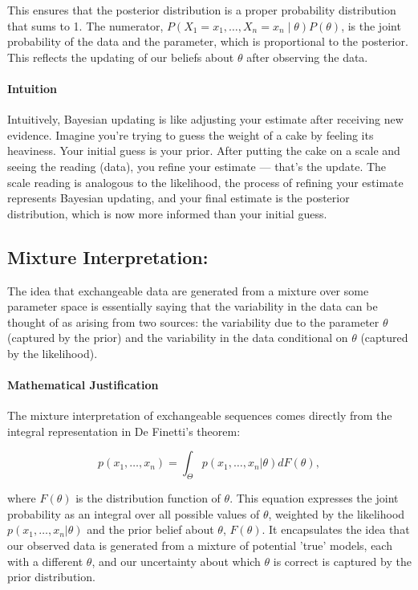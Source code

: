 \documentclass{article}
\begin{document}
This ensures that the posterior distribution is a proper probability distribution that sums to 1. The numerator, \( P(X_1 = x_1, \ldots, X_n = x_n \mid \theta) P(\theta) \), is the joint probability of the data and the parameter, which is proportional to the posterior. This reflects the updating of our beliefs about \( \theta \) after observing the data.

\paragraph{Intuition}
Intuitively, Bayesian updating is like adjusting your estimate after receiving new evidence. Imagine you're trying to guess the weight of a cake by feeling its heaviness. Your initial guess is your prior. After putting the cake on a scale and seeing the reading (data), you refine your estimate — that's the update. The scale reading is analogous to the likelihood, the process of refining your estimate represents Bayesian updating, and your final estimate is the posterior distribution, which is now more informed than your initial guess. 

\subsection{Mixture Interpretation:}
    The idea that exchangeable data are generated from a mixture over some parameter space is essentially saying that the variability in the data can be thought of as arising from two sources: the variability due to the parameter \( \theta \) (captured by the prior) and the variability in the data conditional on \( \theta \) (captured by the likelihood).
\paragraph{Mathematical Justification}
The mixture interpretation of exchangeable sequences comes directly from the integral representation in De Finetti's theorem:

\[
p(x_1, \ldots, x_n) = \int_{\Theta} p(x_1, \ldots, x_n | \theta) dF(\theta),
\]

where \( F(\theta) \) is the distribution function of \( \theta \). This equation expresses the joint probability as an integral over all possible values of \( \theta \), weighted by the likelihood \( p(x_1, \ldots, x_n | \theta) \) and the prior belief about \( \theta \), \( F(\theta) \). It encapsulates the idea that our observed data is generated from a mixture of potential 'true' models, each with a different \( \theta \), and our uncertainty about which \( \theta \) is correct is captured by the prior distribution.
\end{document}
